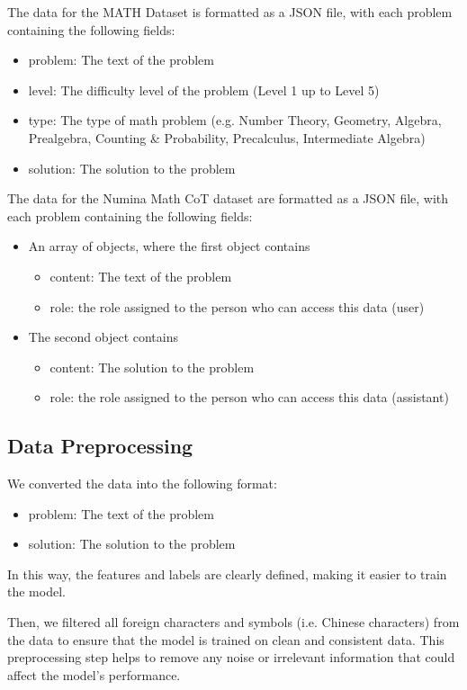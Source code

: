 \documentclass{article}
\begin{document}
The data for the MATH Dataset is formatted as a JSON file, with each problem containing the following fields:
\begin{itemize}
  \item problem: The text of the problem
  \item level: The difficulty level of the problem (Level 1 up to Level 5)
  \item type: The type of math problem (e.g. Number Theory, Geometry, Algebra, Prealgebra, Counting \& Probability, Precalculus, Intermediate Algebra)
  \item solution: The solution to the problem
\end{itemize}

The data for the Numina Math CoT dataset are formatted as a JSON file, with each problem containing the following fields:
\begin{itemize}
  \item An array of objects, where the first object contains
      \begin{itemize}
        \item content: The text of the problem
        \item role: the role assigned to the person who can access this data (user)
      \end{itemize}
  \item The second object contains
      \begin{itemize}
        \item content: The solution to the problem
        \item role: the role assigned to the person who can access this data (assistant)
      \end{itemize}
\end{itemize}

\subsection{Data Preprocessing}

We converted the data into the following format:
\begin{itemize}
  \item problem: The text of the problem
  \item solution: The solution to the problem
\end{itemize}

In this way, the features and labels are clearly defined, making it easier to train the model. 

Then, we filtered all foreign characters and symbols (i.e. Chinese characters) from the data to ensure that the model is trained on clean and consistent data. This preprocessing step helps to remove any noise or irrelevant information that could affect the model's performance.
\end{document}
